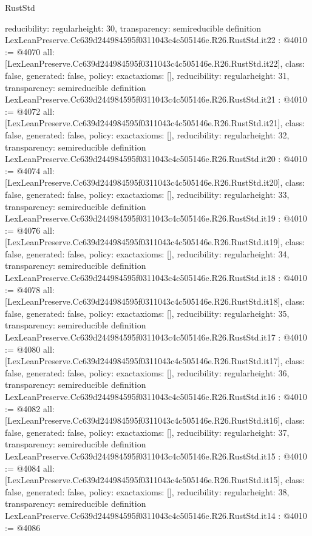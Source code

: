 \begin{lexlean}{RustStd}
\begin{coremodule}
{  reducibility: regular{height: 30},
  transparency: semireducible
}
definition LexLeanPreserve.Cc639d244984595f0311043c4c505146e.R26.RustStd.it22 : @4010 := @4070 {
  all: [LexLeanPreserve.Cc639d244984595f0311043c4c505146e.R26.RustStd.it22],
  class: false,
  generated: false,
  policy: exact{axioms: []},
  reducibility: regular{height: 31},
  transparency: semireducible
}
definition LexLeanPreserve.Cc639d244984595f0311043c4c505146e.R26.RustStd.it21 : @4010 := @4072 {
  all: [LexLeanPreserve.Cc639d244984595f0311043c4c505146e.R26.RustStd.it21],
  class: false,
  generated: false,
  policy: exact{axioms: []},
  reducibility: regular{height: 32},
  transparency: semireducible
}
definition LexLeanPreserve.Cc639d244984595f0311043c4c505146e.R26.RustStd.it20 : @4010 := @4074 {
  all: [LexLeanPreserve.Cc639d244984595f0311043c4c505146e.R26.RustStd.it20],
  class: false,
  generated: false,
  policy: exact{axioms: []},
  reducibility: regular{height: 33},
  transparency: semireducible
}
definition LexLeanPreserve.Cc639d244984595f0311043c4c505146e.R26.RustStd.it19 : @4010 := @4076 {
  all: [LexLeanPreserve.Cc639d244984595f0311043c4c505146e.R26.RustStd.it19],
  class: false,
  generated: false,
  policy: exact{axioms: []},
  reducibility: regular{height: 34},
  transparency: semireducible
}
definition LexLeanPreserve.Cc639d244984595f0311043c4c505146e.R26.RustStd.it18 : @4010 := @4078 {
  all: [LexLeanPreserve.Cc639d244984595f0311043c4c505146e.R26.RustStd.it18],
  class: false,
  generated: false,
  policy: exact{axioms: []},
  reducibility: regular{height: 35},
  transparency: semireducible
}
definition LexLeanPreserve.Cc639d244984595f0311043c4c505146e.R26.RustStd.it17 : @4010 := @4080 {
  all: [LexLeanPreserve.Cc639d244984595f0311043c4c505146e.R26.RustStd.it17],
  class: false,
  generated: false,
  policy: exact{axioms: []},
  reducibility: regular{height: 36},
  transparency: semireducible
}
definition LexLeanPreserve.Cc639d244984595f0311043c4c505146e.R26.RustStd.it16 : @4010 := @4082 {
  all: [LexLeanPreserve.Cc639d244984595f0311043c4c505146e.R26.RustStd.it16],
  class: false,
  generated: false,
  policy: exact{axioms: []},
  reducibility: regular{height: 37},
  transparency: semireducible
}
definition LexLeanPreserve.Cc639d244984595f0311043c4c505146e.R26.RustStd.it15 : @4010 := @4084 {
  all: [LexLeanPreserve.Cc639d244984595f0311043c4c505146e.R26.RustStd.it15],
  class: false,
  generated: false,
  policy: exact{axioms: []},
  reducibility: regular{height: 38},
  transparency: semireducible
}
definition LexLeanPreserve.Cc639d244984595f0311043c4c505146e.R26.RustStd.it14 : @4010 := @4086 {
}
\end{coremodule}
\end{lexlean}
